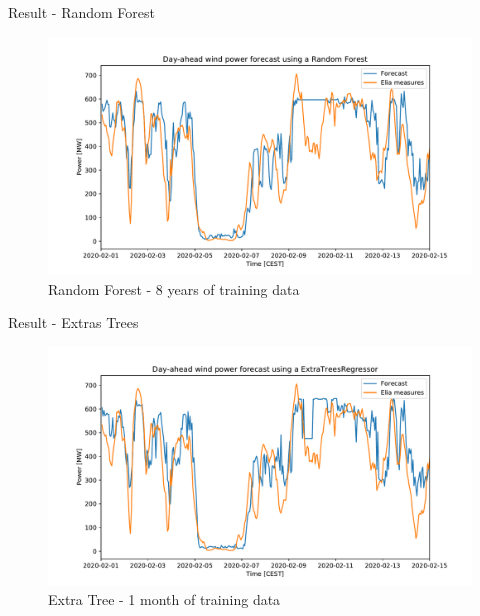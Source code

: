 \documentclass[12pt]{beamer}
\begin{document}
\begin{frame}{Result - Random Forest}
    \begin{figure}
        \centering
        \includegraphics[width=\textwidth]{resources/pdf/rf_8years.pdf}
        \caption{Random Forest - 8 years of training data}
    \end{figure}
\end{frame}

\begin{frame}{Result - Extras Trees}
    \begin{figure}
        \centering
        \includegraphics[width=\textwidth]{resources/pdf/xt_1month.pdf}
        \caption{Extra Tree - 1 month of training data}
    \end{figure}
\end{frame}
\end{document}
